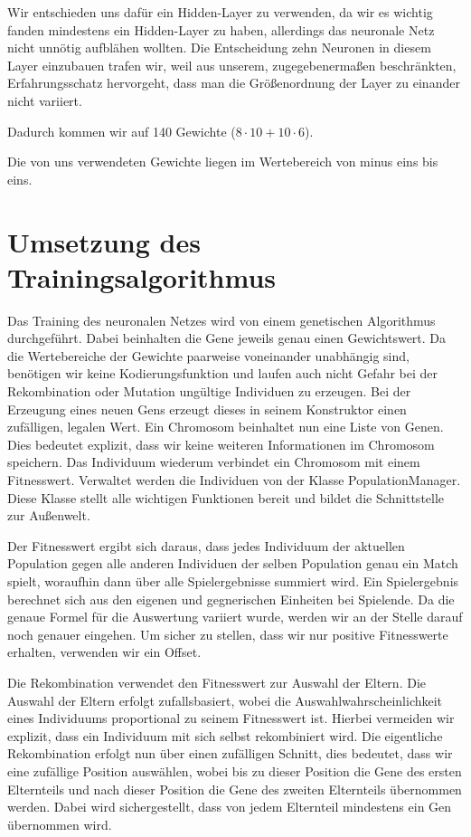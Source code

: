 \documentclass[
	12pt,
	a4paper,
	BCOR10mm,
	DIV14,
	headsepline,
	usegeometry,
]{scrreprt}
\begin{document}
Wir entschieden uns dafür ein Hidden-Layer zu verwenden, da wir es wichtig fanden mindestens ein Hidden-Layer zu haben, allerdings das neuronale Netz nicht unnötig aufblähen wollten.
Die Entscheidung zehn Neuronen in diesem Layer einzubauen trafen wir, weil aus unserem, zugegebenermaßen beschränkten, Erfahrungsschatz hervorgeht, dass man die Größenordnung der Layer zu einander nicht variiert.

Dadurch kommen wir auf 140 Gewichte ($8 \cdot 10 + 10 \cdot 6$).

Die von uns verwendeten Gewichte liegen im Wertebereich von minus eins bis eins.

\section{Umsetzung des Trainingsalgorithmus}
Das Training des neuronalen Netzes wird von einem genetischen Algorithmus durchgeführt.
Dabei beinhalten die Gene jeweils genau einen Gewichtswert.
Da die Wertebereiche der Gewichte paarweise voneinander unabhängig sind, benötigen wir keine Kodierungsfunktion und laufen auch nicht Gefahr bei der Rekombination oder Mutation ungültige Individuen zu erzeugen.
Bei der Erzeugung eines neuen Gens erzeugt dieses in seinem Konstruktor einen zufälligen, legalen Wert.
Ein Chromosom beinhaltet nun eine Liste von Genen.
Dies bedeutet explizit, dass wir keine weiteren Informationen im Chromosom speichern.
Das Individuum wiederum verbindet ein Chromosom mit einem Fitnesswert.
Verwaltet werden die Individuen von der Klasse PopulationManager.
Diese Klasse stellt alle wichtigen Funktionen bereit und bildet die Schnittstelle zur Außenwelt.

Der Fitnesswert ergibt sich daraus, dass jedes Individuum der aktuellen Population gegen alle anderen Individuen der selben Population genau ein Match spielt, woraufhin dann über alle Spielergebnisse summiert wird.
Ein Spielergebnis berechnet sich aus den eigenen und gegnerischen Einheiten bei Spielende.
Da die genaue Formel für die Auswertung variiert wurde, werden wir an der Stelle darauf noch genauer eingehen.
Um sicher zu stellen, dass wir nur positive Fitnesswerte erhalten, verwenden wir ein Offset.

Die Rekombination verwendet den Fitnesswert zur Auswahl der Eltern.
Die Auswahl der Eltern erfolgt zufallsbasiert, wobei die Auswahlwahrscheinlichkeit eines Individuums proportional zu seinem Fitnesswert ist.
Hierbei vermeiden wir explizit, dass ein Individuum mit sich selbst rekombiniert wird.
Die eigentliche Rekombination erfolgt nun über einen zufälligen Schnitt, dies bedeutet, dass wir eine zufällige Position auswählen, wobei bis zu dieser Position die Gene des ersten Elternteils und nach dieser Position die Gene des zweiten Elternteils übernommen werden.
Dabei wird sichergestellt, dass von jedem Elternteil mindestens ein Gen übernommen wird.
\end{document}
